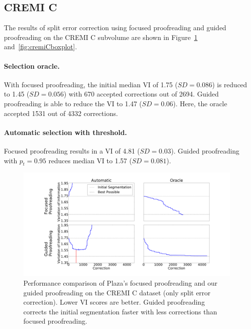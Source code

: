\subsection{CREMI C}

The results of split error correction using focused proofreading and guided proofreading on the CREMI C subvolume are shown in Figure~\ref{fig:cremiCtrails} and~\ref{fig:cremiCboxplot}.

\paragraph{Selection oracle.} With focused proofreading, the initial median VI of 1.75 ($SD=0.086$) is reduced to 1.45 ($SD=0.056$) with 670 accepted corrections out of 2694. Guided proofreading is able to reduce the VI to 1.47 ($SD=0.06$). Here, the oracle accepted 1531 out of 4332 corrections. 

\paragraph{Automatic selection with threshold.} Focused proofreading results in a VI of 4.81 ($SD=0.03$). Guided proofreading with $p_t=0.95$ reduces median VI to 1.57 ($SD=0.081$).

\begin{figure}[t]
\centering
\includegraphics[width=\linewidth]{gfx/cremiCtrails.pdf}
\caption{Performance comparison of Plaza's focused proofreading and our guided proofreading on the CREMI C dataset (only split error correction). Lower VI scores are better. Guided proofreading corrects the initial segmentation faster with less corrections than focused proofreading.}
\label{fig:cremiCtrails}
\end{figure}

